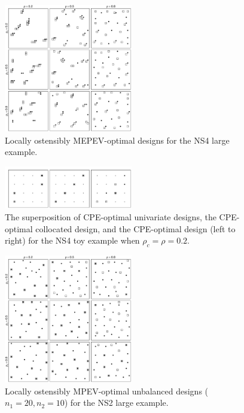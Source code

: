 \documentclass[12pt]{article}
\begin{document}
        \begin{figure}
        \begin{center}
        \includegraphics[width=0.5\textwidth]{saaeblup_NS3.pdf}
        \caption{Locally ostensibly MEPEV-optimal designs for the NS4 large example.}\label{fig:mepevlarger}
        \end{center}
        \end{figure}

        \begin{figure}
        \begin{center}
        \includegraphics[width=0.5\textwidth]{covestns4toy.pdf}
        \caption{The superposition of CPE-optimal univariate designs, the CPE-optimal collocated design, and the CPE-optimal design (left to right) for the NS4 toy example when $\rho_c=\rho=0.2$.}\label{fig:cpens4toy}
        \end{center}
        \end{figure}

        \begin{figure}
        \begin{center}
        \includegraphics[width=0.5\textwidth]{saablup_NS2_imbalanced.pdf}
        \caption{Locally ostensibly MPEV-optimal unbalanced designs ($n_1=20,n_2=10$) for the NS2 large example.}
        \end{center}
        \end{figure}
\end{document}
